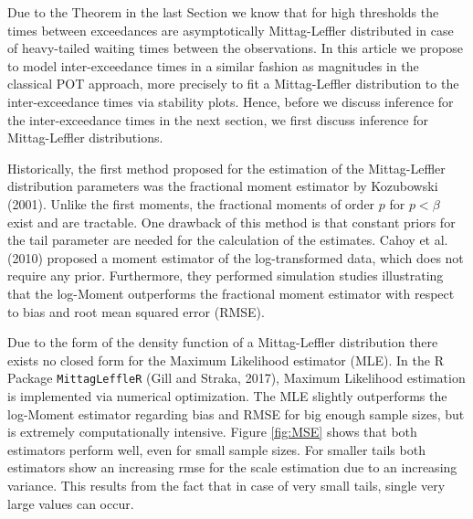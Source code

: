 \documentclass[]{elsarticle} %
\begin{document}
Due to the Theorem in the last Section we know that for high thresholds
the times between exceedances are asymptotically Mittag-Leffler
distributed in case of heavy-tailed waiting times between the
observations. In this article we propose to model inter-exceedance times
in a similar fashion as magnitudes in the classical POT approach, more
precisely to fit a Mittag-Leffler distribution to the inter-exceedance
times via stability plots. Hence, before we discuss inference for the
inter-exceedance times in the next section, we first discuss inference
for Mittag-Leffler distributions.

Historically, the first method proposed for the estimation of the
Mittag-Leffler distribution parameters was the fractional moment
estimator by Kozubowski (2001). Unlike the first moments, the fractional
moments of order \(p\) for \(p<\beta\) exist and are tractable. One
drawback of this method is that constant priors for the tail parameter
are needed for the calculation of the estimates. Cahoy et al. (2010)
proposed a moment estimator of the log-transformed data, which does not
require any prior. Furthermore, they performed simulation studies
illustrating that the log-Moment outperforms the fractional moment
estimator with respect to bias and root mean squared error (RMSE).

Due to the form of the density function of a Mittag-Leffler distribution
there exists no closed form for the Maximum Likelihood estimator (MLE).
In the R Package \texttt{MittagLeffleR} (Gill and Straka, 2017), Maximum
Likelihood estimation is implemented via numerical optimization. The MLE
slightly outperforms the log-Moment estimator regarding bias and RMSE
for big enough sample sizes, but is extremely computationally intensive.
Figure \ref{fig:MSE} shows that both estimators perform well, even for
small sample sizes. For smaller tails both estimators show an increasing
rmse for the scale estimation due to an increasing variance. This
results from the fact that in case of very small tails, single very
large values can occur.
\end{document}
